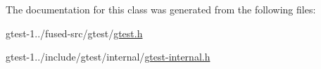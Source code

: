 \-The documentation for this class was generated from the following files\-:\begin{DoxyCompactItemize}
\item 
gtest-\/1../fused-\/src/gtest/\hyperlink{fused-src_2gtest_2gtest_8h}{gtest.\-h}\item 
gtest-\/1../include/gtest/internal/\hyperlink{gtest-internal_8h}{gtest-\/internal.\-h}\end{DoxyCompactItemize}
